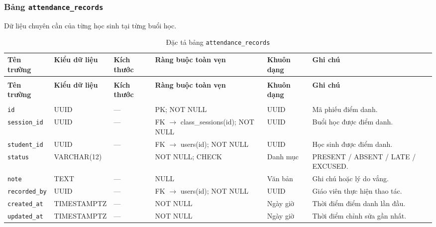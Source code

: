 \subsubsection{Bảng \texttt{attendance\_records}}
Dữ liệu chuyên cần của từng học sinh tại từng buổi học.

\begingroup
\fontsize{9.2}{11.2}\selectfont
\setlength{\tabcolsep}{2.4pt}
\renewcommand{\arraystretch}{1.22}
\begin{longtable}{|>{\raggedright\arraybackslash}p{2.25cm}|>{\raggedright\arraybackslash}p{2.48cm}|>{\raggedright\arraybackslash}p{0.95cm}|>{\raggedright\arraybackslash}p{3.0cm}|>{\raggedright\arraybackslash}p{1.25cm}|>{\raggedright\arraybackslash}p{4.27cm}|}
\caption{Đặc tả bảng \texttt{attendance\_records}}\label{tab:csdl:attendance_records}\\
\hline\rowcolor{blue!11}\textbf{Tên trường}&\textbf{Kiểu dữ liệu}&\textbf{Kích thước}&\textbf{Ràng buộc toàn vẹn}&\textbf{Khuôn dạng}&\textbf{Ghi chú}\\\hline
\endfirsthead
\multicolumn{6}{r}{\textit{Tiếp bảng \texttt{attendance\_records}}}\\
\hline\rowcolor{blue!11}\textbf{Tên trường}&\textbf{Kiểu dữ liệu}&\textbf{Kích thước}&\textbf{Ràng buộc toàn vẹn}&\textbf{Khuôn dạng}&\textbf{Ghi chú}\\\hline
\endhead
\hline\multicolumn{6}{r}{\footnotesize\textit{Còn tiếp trang sau}}\\
\endfoot
\hline
\endlastfoot
\texttt{id} & UUID & — & PK; NOT NULL & UUID & Mã phiếu điểm danh.\\\hline
\rowcolor{gray!5}
\texttt{session\_\allowbreak{}id} & UUID & — & FK $\rightarrow$ class\_\allowbreak{}sessions(id); NOT NULL & UUID & Buổi học được điểm danh.\\\hline
\texttt{student\_\allowbreak{}id} & UUID & — & FK $\rightarrow$ users(id); NOT NULL & UUID & Học sinh được điểm danh.\\\hline
\rowcolor{gray!5}
\texttt{status} & VARCHAR(12) & 12 & NOT NULL; CHECK & Danh mục & PRESENT / ABSENT / LATE / EXCUSED.\\\hline
\texttt{note} & TEXT & — & NULL & Văn bản & Ghi chú hoặc lý do vắng.\\\hline
\rowcolor{gray!5}
\texttt{recorded\_\allowbreak{}by} & UUID & — & FK $\rightarrow$ users(id); NOT NULL & UUID & Giáo viên thực hiện thao tác.\\\hline
\texttt{created\_\allowbreak{}at} & TIMESTAMPTZ & — & NOT NULL & Ngày giờ & Thời điểm điểm danh lần đầu.\\\hline
\rowcolor{gray!5}
\texttt{updated\_\allowbreak{}at} & TIMESTAMPTZ & — & NOT NULL & Ngày giờ & Thời điểm chỉnh sửa gần nhất.\\\hline
\end{longtable}
\endgroup

